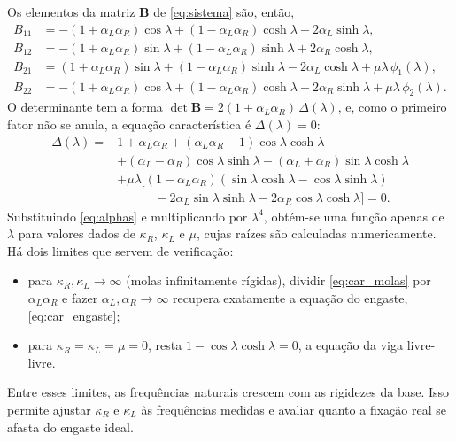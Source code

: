 Os elementos da matriz $\mathbf{B}$ de \eqref{eq:sistema} são, então,
\begin{align*}
    B_{11} & = -(1 + \alpha_L\alpha_R)\cos\lambda + (1 - \alpha_L\alpha_R)\cosh\lambda
    - 2\alpha_L\sinh\lambda,                                                           \\
    B_{12} & = -(1 + \alpha_L\alpha_R)\sin\lambda + (1 - \alpha_L\alpha_R)\sinh\lambda
    + 2\alpha_R\cosh\lambda,                                                           \\
    B_{21} & = (1 + \alpha_L\alpha_R)\sin\lambda + (1 - \alpha_L\alpha_R)\sinh\lambda
    - 2\alpha_L\cosh\lambda + \mu\lambda\,\phi_1(\lambda),                             \\
    B_{22} & = -(1 + \alpha_L\alpha_R)\cos\lambda + (1 - \alpha_L\alpha_R)\cosh\lambda
    + 2\alpha_R\sinh\lambda + \mu\lambda\,\phi_2(\lambda).
\end{align*}
O determinante tem a forma $\det\mathbf{B} = 2(1 + \alpha_L\alpha_R)\,\Delta(\lambda)$,
e, como o primeiro fator não se anula, a equação característica é
$\Delta(\lambda) = 0$:
\begin{equation}
    \begin{split}
        \Delta(\lambda) ={} & 1 + \alpha_L\alpha_R
        + (\alpha_L\alpha_R - 1)\cos\lambda\cosh\lambda                      \\
                            & + (\alpha_L - \alpha_R)\cos\lambda\sinh\lambda
        - (\alpha_L + \alpha_R)\sin\lambda\cosh\lambda                       \\
                            & + \mu\lambda\Big[(1 - \alpha_L\alpha_R)
        (\sin\lambda\cosh\lambda - \cos\lambda\sinh\lambda)                  \\
                            & \qquad\quad - 2\alpha_L\sin\lambda\sinh\lambda
            - 2\alpha_R\cos\lambda\cosh\lambda\Big] = 0.
    \end{split}
    \label{eq:car_molas}
\end{equation}
Substituindo \eqref{eq:alphas} e multiplicando por $\lambda^4$, obtém-se uma função
apenas de $\lambda$ para valores dados de $\kappa_R$, $\kappa_L$ e $\mu$, cujas raízes
são calculadas numericamente. Há dois limites que servem de verificação:
\begin{itemize}
    \item para $\kappa_R, \kappa_L \to \infty$ (molas infinitamente rígidas), dividir
          \eqref{eq:car_molas} por $\alpha_L\alpha_R$ e fazer $\alpha_L,\alpha_R\to\infty$
          recupera exatamente a equação do engaste, \eqref{eq:car_engaste};
    \item para $\kappa_R = \kappa_L = \mu = 0$, resta $1 - \cos\lambda\cosh\lambda = 0$,
          a equação da viga livre-livre.
\end{itemize}
Entre esses limites, as frequências naturais crescem com as rigidezes da base. Isso
permite ajustar $\kappa_R$ e $\kappa_L$ às frequências medidas e avaliar quanto a
fixação real se afasta do engaste ideal.

